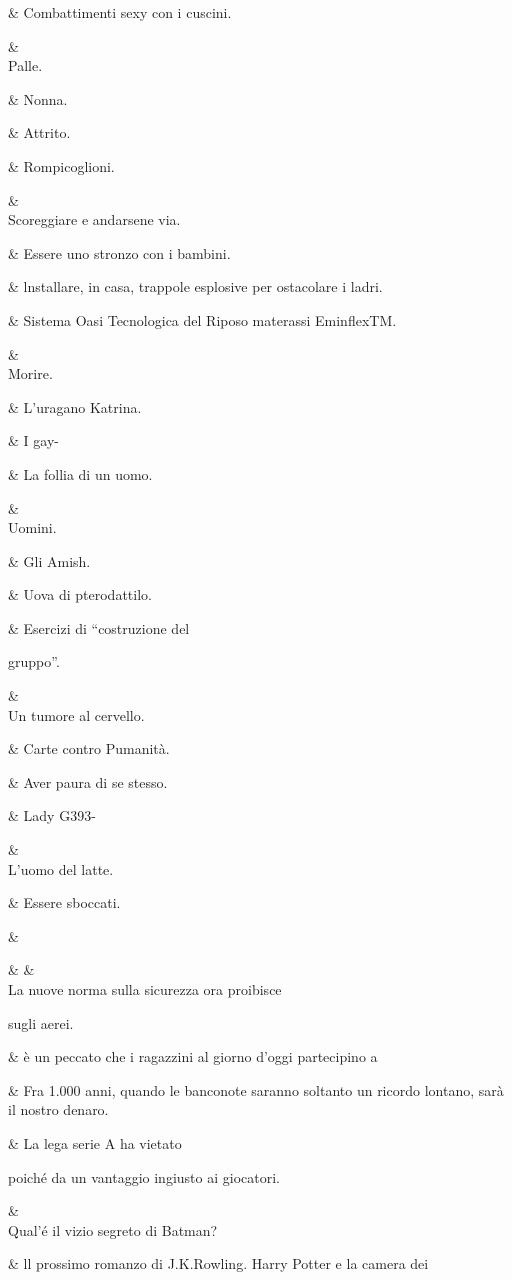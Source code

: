 &
Combattimenti
sexy con i
cuscini.

&
\\
Palle.

&
Nonna.

&
Attrito.

&
Rompicoglioni.

&
\\
Scoreggiare e
andarsene via.

&
Essere uno
stronzo con i
bambini.

&
lnstallare, in
casa, trappole
esplosive per
ostacolare i ladri.

&
Sistema Oasi
Tecnologica del
Riposo materassi
EminflexTM.

&
\\
Morire.

&
L’uragano
Katrina.

&
I gay-

&
La follia di un
uomo.

&
\\
Uomini.

&
Gli Amish.

&
Uova di
pterodattilo.

&
Esercizi di
“costruzione del

gruppo”.

&
\\
Un tumore al
cervello.

&
Carte contro
Pumanità.

&
Aver paura di se
stesso.

&
Lady G393-

&
\\
L’uomo del latte.

&
Essere sboccati.

&
 

&
&
\\
La nuove norma
sulla sicurezza
ora proibisce

sugli aerei.

&
è un peccato
che i ragazzini
al giorno d’oggi
partecipino a

&
Fra 1.000 anni,
quando le
banconote saranno
soltanto un ricordo
lontano, sarà
il nostro denaro.

&
La lega serie
A ha vietato

poiché da un
vantaggio ingiusto
ai giocatori.

&
\\
Qual’é il vizio
segreto di
Batman?

&
ll prossimo
romanzo di
J.K.Rowling.
Harry Potter e
la camera dei

